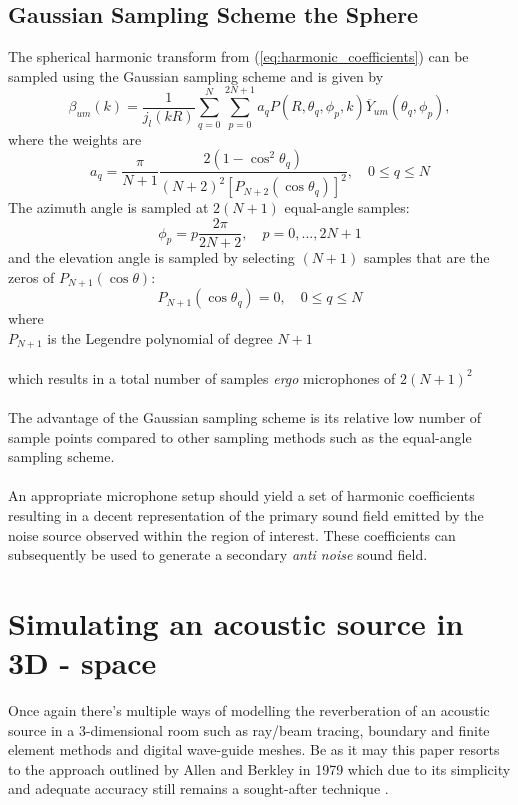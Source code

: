 \subsection{Gaussian Sampling Scheme the Sphere}\label{sec:Gaussian}
The spherical harmonic transform from (\ref{eq:harmonic_coefficients}) can be sampled using the Gaussian sampling scheme and is given by
\begin{equation}
    \beta_{um}(k) = \frac{1}{j_l(kR)} \sum_{q=0}^N\sum_{p=0}^{2N+1}a_qP(R,\theta_q,\phi_p,k)\overline Y_{um}(\theta_q,\phi_p),
    \label{eq:gauss_harmonic_coefficients}
\end{equation}
where the weights are
\begin{equation}
    a_q = \frac{\pi}{N+1}\frac{2(1-\cos^2\theta_q)}{(N+2)^2[P_{N+2}(\cos \theta_q)]^2}, \quad 0 \leq q\leq N
    \label{eq:gauss_weights}
\end{equation}
The azimuth angle is sampled at $2(N+1)$ equal-angle samples:
\begin{equation}
    \phi_p = p\frac{2\pi}{2N+2},\quad p=0,...,2N+1
    \label{eq:azimuth_sample}
\end{equation}
and the elevation angle is sampled by selecting $(N+1)$ samples that are the zeros of $P_{N+1}(\cos\theta)$:
\begin{equation}
    P_{N+1}(\cos\theta_q)=0, \quad 0 \leq q \leq N
    \label{eq:elevation_sample}
\end{equation}
where\\
$P_{N+1}$ is the Legendre polynomial of degree $N+1$\\\\
which results in a total number of samples \textit{ergo} microphones of $2(N+1)^2$\\\\
The advantage of the Gaussian sampling scheme is its relative low number of sample points compared to other sampling methods such as the equal-angle sampling scheme\cite{Rafaely2015}.\\\\
An appropriate microphone setup should yield a set of harmonic coefficients resulting in a decent representation of the primary sound field emitted by the noise source observed within the region of interest. These coefficients can subsequently be used to generate a secondary \textit{anti noise} sound field.





\section{Simulating an acoustic source in 3D - space}\label{sec:Simulation}
Once again there's multiple ways of modelling the reverberation of an acoustic source in a 3-dimensional room such as ray/beam tracing, boundary and finite element methods and digital wave-guide meshes. Be as it may this paper resorts to the approach outlined by Allen and Berkley in 1979 which due to its simplicity and adequate accuracy still remains a sought-after technique \cite{Samarasinghe2018}.




